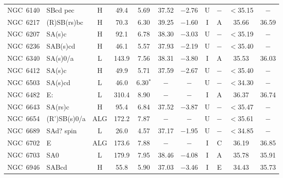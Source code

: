 \begin{center}
\begin{longtable}{lC{2.5cm}ccccccccc}
NGC~6140  & SBcd pec    &    H           &   49.4       &   5.69        &   37.52      &   $-$2.76     &   U &  $-$      & $<$35.15 & $-$  \\
NGC~6217 & (R)SB(rs)bc       & H                 & 70.3  & 6.30                & 39.25    & $-$1.60        & I   & A        & 35.66    & 36.59         \\
NGC~6207 & SA(s)c            & H                 & 92.1  & 6.78                & 38.30    & $-$3.03        & U   &$-$       & $<$35.19 & $-$            \\
NGC~6236 & SAB(s)cd          & H                 & 46.1  & 5.57                & 37.93    & $-$2.19        & U   &$-$       & $<$35.40 & $-$            \\
NGC~6340 & SA(s)0/a          & L                 & 143.9 & 7.56                & 38.31    & $-$3.80        & I   & A        & 35.53    & 36.03         \\
NGC~6412 & SA(s)c            & H                 & 49.9  & 5.71                & 37.59    & $-$2.67        & U   &$-$       & $<$35.40 & $-$            \\
NGC~6503 & SA(s)cd          & L                & 46.0    & 6.30$^{*}$           & $-$      & $-$        & U   &$-$      & $<$34.30 & $-$           \\
NGC~6482 & E:                 & L           & 310.4 & 8.90                 & $-$      & $-$       & I   & A         & 36.37 & 36.74           \\
NGC~6643 & SA(rs)c         & H                 & 95.4  & 6.84                & 37.52    & $-$3.87          & U   &$-$        & $<$35.47 & $-$           \\
NGC~6654 & (R')SB(s)0/a   & ALG               & 172.2 & 7.87                & $-$      & $-$        & U   &$-$        & $<$35.61 & $-$           \\
NGC~6689 & SAd? spin       & L                 & 26.0    & 4.57                & 37.17    & $-$1.95    & U   &$-$        & $<$34.85 & $-$           \\
NGC~6702  &  E               &  ALG             &  173.6   &  7.88              &  $-$      &   $-$       &    I  & C    &   36.19   &  36.85   \\
NGC~6703  & SA0           &  L                   &   179.9  &   7.95          &   38.46   &  $-$4.08   &  I & A   &  35.78    &   35.91   \\
NGC~6946  & SABcd       &   H                 &   55.8    &   5.90          &  37.03    &  $-$3.46   &   I & E    &   34.43   & 35.73   \\ 

\end{longtable}
\end{center}
